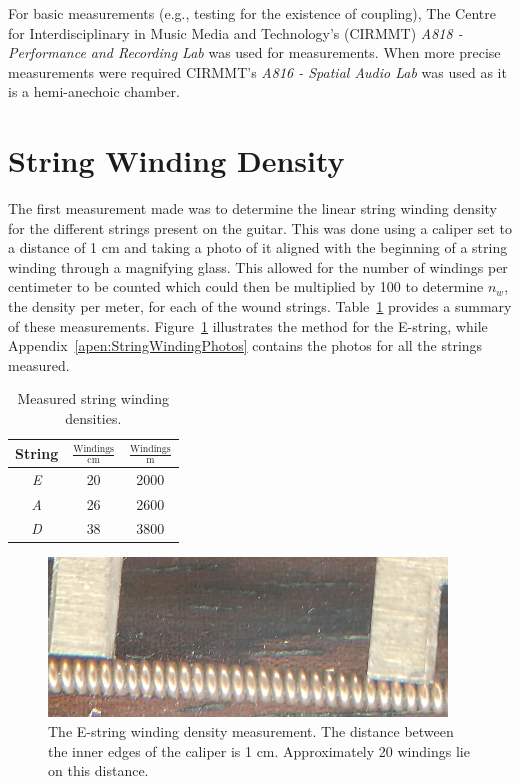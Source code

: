 \documentclass[../main.tex]{subfiles}
\begin{document}
For basic measurements (e.g., testing for the existence of coupling), The Centre for Interdisciplinary in Music Media and Technology's (CIRMMT) \emph{A818 - Performance and Recording Lab} was used for measurements. When more precise measurements were required CIRMMT's \emph{A816 - Spatial Audio Lab} was used as it is a hemi-anechoic chamber.

\section{String Winding Density}
The first measurement made was to determine the linear string winding density for the different strings present on the guitar. This was done using a caliper set to a distance of 1 cm and taking a photo of it aligned with the beginning of a string winding through a magnifying glass. This allowed for the number of windings per centimeter to be counted which could then be multiplied by 100 to determine $n_w$, the density per meter, for each of the wound strings. Table~\ref{tab:WindingDensities} provides a summary of these measurements. Figure~\ref{fig:EWindings} illustrates the method for the E-string, while Appendix~\ref{apen:StringWindingPhotos} contains the photos for all the strings measured.

\begin{table}[h]
\centering
    \begin{tabular}{||c|| c| c||} 
        \hline
        String & $\frac{\text{Windings}}{\text{cm}}$ & $\frac{\text{Windings}}{\text{m}}$ \\ [0.5ex] 
        \hline
        \hline
        \emph{E} & 20 & 2000 \\ 
        \hline
        \emph{A} & 26 & 2600 \\
        \hline
        \emph{D} & 38 & 3800 \\ 
        \hline
    \end{tabular}
\caption{Measured string winding densities.}
\label{tab:WindingDensities}
\end{table}

\begin{figure}[h]
    \centering
    \includegraphics[scale=1]{./images/pictures/WindingsEZoom.png}
    \caption{The E-string winding density measurement. The distance between the inner edges of the caliper is 1 cm. Approximately 20 windings lie on this distance.}
    \label{fig:EWindings}
\end{figure}
\end{document}
